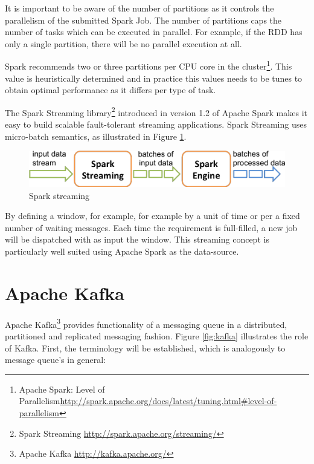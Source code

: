 It is important to be aware of the number of partitions as it controls the parallelism of the submitted Spark Job. The number of partitions caps the number of tasks which can be executed in parallel. For example, if the RDD has only a single partition, there will be no parallel execution at all.

Spark recommends two or three partitions per CPU core in the cluster\footnote{Apache Spark: Level of Parallelism\url{http://spark.apache.org/docs/latest/tuning.html\#level-of-parallelism}}. This value is heuristically determined and in practice this values needs to be tunes to obtain optimal performance as it differs per type of task.

The Spark Streaming library\footnote{Spark Streaming \url{http://spark.apache.org/streaming/}} introduced in version 1.2 of Apache Spark makes it easy to build scalable fault-tolerant streaming applications. Spark Streaming uses micro-batch semantics, as illustrated in Figure \ref{fig:streaming}.

\begin{figure}[ht!]
\centering
\includegraphics[width=.9\textwidth]{figures/flow.png}
\caption{Spark streaming \label{fig:streaming}}
\end{figure}

By defining a window, for example, for example by a unit of time or per a fixed number of waiting messages. Each time the requirement is full-filled, a new job will be dispatched with as input the window. This streaming concept is particularly well suited using Apache Spark as the data-source.

\section{Apache Kafka \label{subsec_kafka}}

Apache Kafka\footnote{Apache Kafka \url{http://kafka.apache.org/}} provides functionality of a messaging queue in a distributed, partitioned and replicated messaging fashion. Figure \ref{fig:kafka} illustrates the role of Kafka. First, the terminology will be established, which is analogously to message queue's in general:

